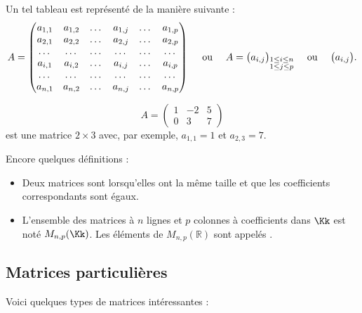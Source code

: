 \documentclass[class=report,crop=false]{standalone}
\begin{document}
 Un tel tableau est représenté de la manière suivante :
$$A=\begin{pmatrix}
a_{1,1}& a_{1,2}& \dots & a_{1,j}& \dots & a_{1,p}\cr
a_{2,1}& a_{2,2}& \dots & a_{2,j}& \dots &a_{2,p}\cr
\dots & \dots & \dots & \dots & \dots & \dots \cr
a_{i,1}& a_{i,2} & \dots & a_{i,j}& \dots &a_{i,p} \cr
\dots & \dots & \dots & \dots & \dots & \dots \cr
a_{n,1}& a_{n,2}& \dots & a_{n,j}& \dots & a_{n,p}\cr
\end{pmatrix}
\quad \text{ ou } \quad
A= \big(a_{i,j}\big)_{\substack{1\leq i \leq n \\ 1\leq j \leq p}}
\quad \text{ ou } \quad
\big(a_{i,j}\big).
$$

\begin{exemple}
$$ A  =  \left(
 \begin{array}{ccc}
1 & -2 & 5\\
0 & 3  & 7
\end{array}
\right)$$
est une matrice $2\times 3$ avec, par exemple, $a_{1,1}=1$ et $a_{2,3}=7$.
 \end{exemple}

Encore quelques définitions :
\begin{definition}
\sauteligne
\begin{itemize}

  \item Deux matrices sont  lorsqu'elles ont la même taille
  et que les coefficients correspondants sont égaux.

  \item L'ensemble des matrices à $n$ lignes et $p$ colonnes à
coefficients dans $\Kk$ est noté $M_{n,p}(\Kk)$.
Les éléments de $M_{n,p}(\mathbb{R})$ sont appelés
.
\end{itemize}
\end{definition}




\subsection{Matrices particulières}

Voici quelques types de matrices intéressantes :
\end{document}
